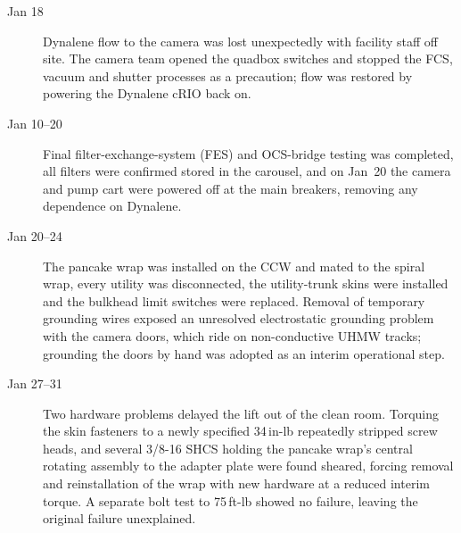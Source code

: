 \begin{description}
\item[Jan 18] Dynalene flow to the camera was lost unexpectedly with
  facility staff off site.  The camera team opened the quadbox
  switches and stopped the FCS, vacuum and shutter processes as a
  precaution; flow was restored by powering the Dynalene cRIO back on.

\item[Jan 10--20] Final filter-exchange-system (FES) and OCS-bridge
  testing was completed, all filters were confirmed stored in the
  carousel, and on Jan~20 the camera and pump cart were powered off at
  the main breakers, removing any dependence on Dynalene.

\item[Jan 20--24] The pancake wrap was installed on the CCW and mated
  to the spiral wrap, every utility was disconnected, the
  utility-trunk skins were installed and the bulkhead limit switches
  were replaced.  Removal of temporary grounding wires exposed an
  unresolved electrostatic grounding problem with the camera doors,
  which ride on non-conductive UHMW tracks; grounding the doors by
  hand was adopted as an interim operational step.

\item[Jan 27--31] Two hardware problems delayed the lift out of the
  clean room.  Torquing the skin fasteners to a newly specified
  34\,in-lb repeatedly stripped screw heads, and several 3/8-16 SHCS
  holding the pancake wrap's central rotating assembly to the adapter
  plate were found sheared, forcing removal and reinstallation of the
  wrap with new hardware at a reduced interim torque.  A separate
  bolt test to 75\,ft-lb showed no failure, leaving the original
  failure unexplained.
\end{description}

